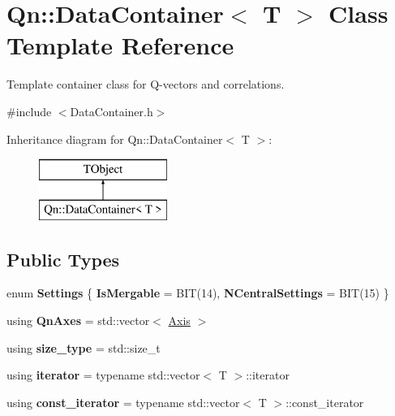 \hypertarget{classQn_1_1DataContainer}{}\section{Qn\+:\+:Data\+Container$<$ T $>$ Class Template Reference}
\label{classQn_1_1DataContainer}


Template container class for Q-\/vectors and correlations.  




{\ttfamily \#include $<$Data\+Container.\+h$>$}

Inheritance diagram for Qn\+:\+:Data\+Container$<$ T $>$\+:\begin{figure}[H]
\begin{center}
\leavevmode
\includegraphics[height=2.000000cm]{classQn_1_1DataContainer}
\end{center}
\end{figure}
\subsection*{Public Types}
\begin{DoxyCompactItemize}
\item 
\mbox{\label{classQn_1_1DataContainer_a5a4ec4b1dad17823d08521e87bb82d80}} 
enum {\bfseries Settings} \{ {\bfseries Is\+Mergable} = B\+IT(14), 
{\bfseries N\+Central\+Settings} = B\+IT(15)
 \}
\item 
\mbox{\label{classQn_1_1DataContainer_ada8edb56cdc0396c0221600a29a19b15}} 
using {\bfseries Qn\+Axes} = std\+::vector$<$ \mbox{\hyperlink{classQn_1_1Axis}{Axis}} $>$
\item 
\mbox{\label{classQn_1_1DataContainer_a3b96114bb9dfccb532095194bd26837c}} 
using {\bfseries size\+\_\+type} = std\+::size\+\_\+t
\item 
\mbox{\label{classQn_1_1DataContainer_a1cf7439f08b74652e4016d7b6586dbf1}} 
using {\bfseries iterator} = typename std\+::vector$<$ T $>$\+::iterator
\item 
\mbox{\label{classQn_1_1DataContainer_a241d6f7b4490707b08ce0a8aa08b07a1}} 
using {\bfseries const\+\_\+iterator} = typename std\+::vector$<$ T $>$\+::const\+\_\+iterator
\end{DoxyCompactItemize}
